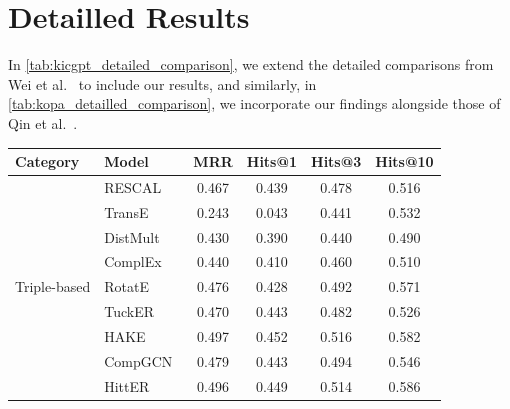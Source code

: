 \documentclass[12pt,a4paper]{article}
\begin{document}
\pagebreak
\appendix
\section{Detailled Results}

In \cref{tab:kicgpt_detailed_comparison}, we extend the detailed comparisons from Wei et al.~\cite{wei2023kicgpt} to include our results, and similarly, in \cref{tab:kopa_detailled_comparison}, we incorporate our findings alongside those of Qin et al.~\cite{qin2023kopa}.

\begin{table}
    \centering
    \begin{tabular}{l|l|c|c|c|c|}
        \toprule
        \textbf{Category} & \textbf{Model}                           & \textbf{MRR}      & \textbf{Hits@1}   & \textbf{Hits@3}   & \textbf{Hits@10}  \\
        \midrule

        \multirow{9}{*}{Triple-based}
        & RESCAL~\cite{nickel2011three}            & 0.467             & 0.439             & 0.478             & 0.516             \\
        & TransE~\cite{bordes2013translating}      & 0.243             & 0.043             & 0.441             & 0.532             \\
        & DistMult~\cite{yang2014embedding}        & 0.430             & 0.390             & 0.440             & 0.490             \\
        & ComplEx~\cite{trouillon2016complex}      & 0.440             & 0.410             & 0.460             & 0.510             \\
        & RotatE~\cite{sun2019rotate}              & 0.476             & 0.428             & 0.492             & 0.571             \\
        & TuckER~\cite{balavzevic2019tucker}       & 0.470             & 0.443             & 0.482             & 0.526             \\
        & HAKE~\cite{zhang2020learning}            & 0.497             & 0.452             & 0.516             & 0.582             \\
        & CompGCN~\cite{vashishth2019composition}  & 0.479             & 0.443             & 0.494             & 0.546             \\
        & HittER~\cite{chen-etal-2021-hitter}      & 0.496             & 0.449             & 0.514             & 0.586             \\
        \midrule


\end{tabular}
\end{table}
\end{document}

